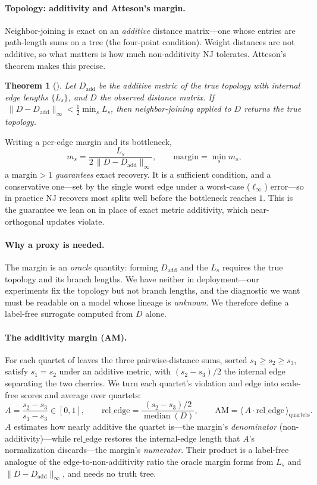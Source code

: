 \documentclass{article}
\newtheorem{theorem}{Theorem}
\theoremstyle{definition}
\theoremstyle{plain}
\begin{document}
\paragraph{Topology: additivity and Atteson's margin.}
Neighbor-joining is exact on an \emph{additive} distance matrix---one whose entries are path-length sums
on a tree (the four-point condition). Weight distances are not additive, so what matters is how much
non-additivity NJ tolerates. Atteson's theorem makes this precise.
\begin{theorem}[\citealp{atteson1999performance}]\label{thm:atteson}
Let $D_{\mathrm{add}}$ be the additive metric of the true topology with internal edge lengths
$\{L_s\}$, and $D$ the observed distance matrix. If
$\;\lVert D-D_{\mathrm{add}}\rVert_\infty < \tfrac12\min_s L_s$, then neighbor-joining applied to $D$
returns the true topology.
\end{theorem}
Writing a per-edge margin and its bottleneck,
\[
  m_s = \frac{L_s}{2\,\lVert D-D_{\mathrm{add}}\rVert_\infty},
  \qquad
  \mathrm{margin} = \min_s m_s,
\]
a $\mathrm{margin}>1$ \emph{guarantees} exact recovery. It is a sufficient condition, and a conservative
one---set by the single worst edge under a worst-case ($\ell_\infty$) error---so in practice NJ recovers
most splits well before the bottleneck reaches $1$. This is the guarantee we lean on in place of exact
metric additivity, which near-orthogonal updates violate.

\paragraph{Why a proxy is needed.}
The margin is an \emph{oracle} quantity: forming $D_{\mathrm{add}}$ and the $L_s$ requires the true
topology and its branch lengths. We have neither in deployment---our experiments fix the topology but
not branch lengths, and the diagnostic we want must be readable on a model whose lineage is
\emph{unknown}. We therefore define a label-free surrogate computed from $D$ alone.

\paragraph{The additivity margin (AM).}
For each quartet of leaves the three pairwise-distance sums, sorted $s_1\ge s_2\ge s_3$, satisfy
$s_1=s_2$ under an additive metric, with $(s_2-s_3)/2$ the internal edge separating the two cherries.
We turn each quartet's violation and edge into scale-free scores and average over quartets:
\[
  A=\frac{s_2-s_3}{s_1-s_3}\in[0,1],
  \qquad
  \mathrm{rel\_edge}=\frac{(s_2-s_3)/2}{\operatorname{median}(D)},
  \qquad
  \mathrm{AM}=\big\langle\, A\cdot\mathrm{rel\_edge}\,\big\rangle_{\text{quartets}} .
\]
$A$ estimates how nearly additive the quartet is---the margin's \emph{denominator} (non-additivity)---while
$\mathrm{rel\_edge}$ restores the internal-edge length that $A$'s normalization discards---the margin's
\emph{numerator}. Their product is a label-free analogue of the edge-to-non-additivity ratio the oracle
margin forms from $L_s$ and $\lVert D-D_{\mathrm{add}}\rVert_\infty$, and needs no truth tree.
\end{document}
